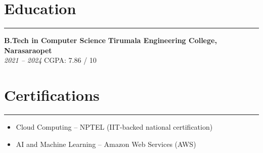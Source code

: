 \documentclass[10pt]{article}
\begin{document}
\section*{Education}
\vspace{1pt}\hrule\vspace{4pt}
\textbf{B.Tech in Computer Science} \hfill \textbf{Tirumala Engineering College, Narasaraopet} \\
\textit{2021 -- 2024} \quad CGPA: 7.86 / 10

\section*{Certifications}
\vspace{1pt}\hrule\vspace{4pt}
\begin{itemize}
  \item Cloud Computing -- NPTEL (IIT-backed national certification)
  \item AI and Machine Learning -- Amazon Web Services (AWS)
\end{itemize}
\end{document}
